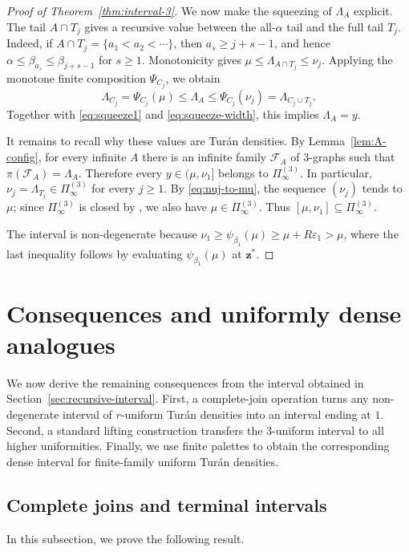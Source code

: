 \documentclass[10pt]{article}
\numberwithin{equation}{section}
\newcommand{\eps}{\varepsilon}
\begin{document}
\begin{proof}[Proof of Theorem~\ref{thm:interval-3}]
We now make the squeezing of $\Lambda_A$ explicit. The tail $A\cap T_j$ gives a recursive value between the all-$\alpha$ tail and the full tail $T_j$. Indeed, if $A\cap T_j=\{a_1<a_2<\cdots\}$, then $a_s\ge j+s-1$, and hence $\alpha\le \beta_{a_s}\le \beta_{j+s-1}$ for $s\ge 1$. Monotonicity gives $\mu\le \Lambda_{A\cap T_j}\le \nu_j$. Applying the monotone finite composition $\Psi_{C_j}$, we obtain
\[
        \Lambda_{C_j}=\Psi_{C_j}(\mu) \le \Lambda_A \le \Psi_{C_j}(\nu_j)=\Lambda_{C_j\cup T_j}.
\]
Together with \eqref{eq:squeeze1} and \eqref{eq:squeeze-width}, this implies $\Lambda_A=y$.

It remains to recall why these values are Tur\'an densities. By Lemma~\ref{lem:A-config}, for every infinite $A$ there is an infinite family $\mathcal F_A$ of $3$-graphs such that $\pi(\mathcal F_A)=\Lambda_A$. Therefore every $y\in(\mu,\nu_1]$ belongs to $\Pi^{(3)}_\infty$. In particular, $\nu_j=\Lambda_{T_j}\in\Pi^{(3)}_\infty$ for every $j\ge 1$. By \eqref{eq:nuj-to-mu}, the sequence $(\nu_j)$ tends to $\mu$; since $\Pi^{(3)}_\infty$ is closed by \cite[Proposition 1]{Pikhurko2014}, we also have $\mu\in\Pi^{(3)}_\infty$. Thus $[\mu,\nu_1]\subseteq\Pi^{(3)}_\infty$.

The interval is non-degenerate because $\nu_1\ge \psi_{\beta_1}(\mu)\ge \mu+R\eps_1>\mu$, where the last inequality follows by evaluating $\psi_{\beta_1}(\mu)$ at $\mathbf{z}^*$.
\end{proof}

\section{Consequences and uniformly dense analogues}
\label{sec:extensions-uniform-analogue}
%
We now derive the remaining consequences from the interval obtained in Section~\ref{sec:recursive-interval}. First, a complete-join operation turns any non-degenerate interval of $r$-uniform Tur\'an densities into an interval ending at $1$. Second, a standard lifting construction transfers the $3$-uniform interval to all higher uniformities. Finally, we use finite palettes to obtain the corresponding dense interval for finite-family uniform Tur\'an densities.

\subsection{Complete joins and terminal intervals}
\label{sec:complete-joins}
%
In this subsection, we prove the following result. 
\end{document}
